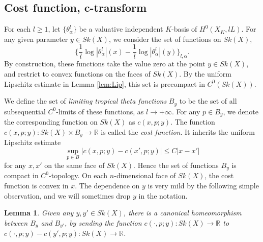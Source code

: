 \documentclass[a4paper]{article}
\newtheorem{lem}[thm]{Lemma}
\theoremstyle{definition}
\newcommand{\R}{\mathbb{R}}
\begin{document}
	
	
	
	
	
	
	
	
	
	
	
	\subsection{Cost function, c-transform}\label{sec:costfunction}
	
	
	

	
For each $l\geq 1$, let $\{  \theta_\alpha^l  \}$ be a valuative independent $K$-basis of $H^0(X_K, lL)$. 
For any given parameter $y\in Sk(X)$, we consider the set of functions on $Sk(X)$,
\[
\{      \frac{1}{l}  \log |\theta_\alpha^l | (x)-   \frac{1}{l}  \log |\theta_\alpha^l | (y) \}_{l,\alpha}.
\]
By construction, these functions take the value zero at the point $y\in Sk(X)$, and restrict to convex functions on the faces of $Sk(X)$. 
By the uniform Lipschitz estimate in Lemma \ref{lem:Lip}, this set is precompact in $C^0(Sk(X))$.



We define the set of \emph{limiting tropical theta functions} $B_y$ to be the set of all subsequential $C^0$-limits of these functions, as $l\to +\infty$. 
For any $p\in B_y$, we denote the corresponding function on $Sk(X)$ as $c(x,p; y)$. The function $c(x,p;y): Sk(X)\times B_y\to \R$ is called the \emph{cost function}. It inherits the uniform Lipschitz estimate
\begin{equation}\label{eqn:costfunctionLipschitz}
\sup_{p\in B} |c(x,p; y)- c(x',p; y)|\leq C|x-x'|
\end{equation}
for any $x,x'$ on the same face of $Sk(X)$. Hence the set of functions $B_y$ is compact in $C^0$-topology.
 On each $n$-dimensional face of $Sk(X)$, the cost function is convex in $x$. The dependence on $y$ is very mild by the following simple observation, and we will sometimes drop $y$ in the notation.
	
	

	

	
	
	\begin{lem}\label{lem:changey}
		Given any $y, y'\in Sk(X)$, there is a canonical homeomorphism between $B_y$ and $B_{y'}$, by sending the function $c(\cdot ,p;y): Sk(X)\to \R$ to $c(\cdot, p; y)-c(y', p; y): Sk(X)\to \R$. 
	\end{lem}
	
	
	
\end{document}
